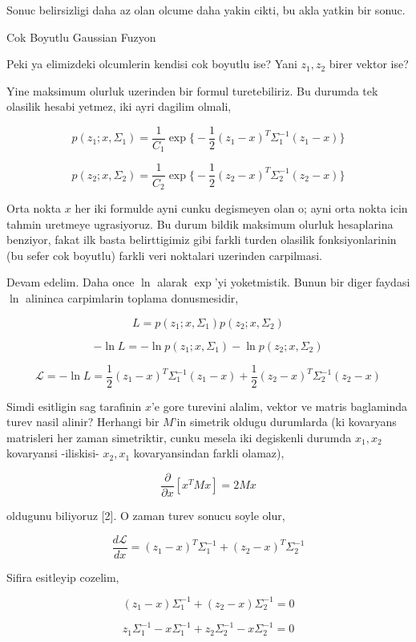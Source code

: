 \documentclass[12pt,fleqn]{article}\usepackage{../common}
\begin{document}
Sonuc belirsizligi daha az olan olcume daha yakin cikti, bu akla yatkin
bir sonuc.

Cok Boyutlu Gaussian Fuzyon

Peki ya elimizdeki olcumlerin kendisi cok boyutlu ise? Yani $z_1,z_2$ birer
vektor ise?

Yine maksimum olurluk uzerinden bir formul turetebiliriz. Bu durumda tek
olasilik hesabi yetmez, iki ayri dagilim olmali,

$$ p(z_1;x,\Sigma_1) =  \frac{ 1}{C_1} \exp 
\bigg\{ 
-\frac{ 1}{2}(z_1-x)^T\Sigma_1^{-1}(z_1-x)
\bigg\} $$

$$ p(z_2;x,\Sigma_2) =  \frac{ 1}{C_2} \exp 
\bigg\{ 
-\frac{ 1}{2}(z_2-x)^T\Sigma_2^{-1}(z_2-x)
\bigg\} $$

Orta nokta $x$ her iki formulde ayni cunku degismeyen olan o; ayni orta
nokta icin tahmin uretmeye ugrasiyoruz. Bu durum bildik maksimum olurluk
hesaplarina benziyor, fakat ilk basta belirttigimiz gibi farkli turden
olasilik fonksiyonlarinin (bu sefer cok boyutlu) farkli veri noktalari
uzerinden carpilmasi.

Devam edelim. Daha once $\ln$ alarak $\exp$'yi yoketmistik. Bunun bir diger
faydasi $\ln$ alininca carpimlarin toplama donusmesidir, 

$$ L = p(z_1;x,\Sigma_1) p(z_2;x,\Sigma_2) 
$$

$$ -\ln L = -\ln p(z_1;x,\Sigma_1) -\ln p(z_2;x,\Sigma_2) 
$$

$$ 
\mathcal{L} = 
-\ln L = 
\frac{ 1}{2}(z_1-x)^T\Sigma_1^{-1}(z_1-x) + 
\frac{ 1}{2}(z_2-x)^T\Sigma_2^{-1}(z_2-x)
$$

Simdi esitligin sag tarafinin $x$'e gore turevini alalim, vektor ve matris
baglaminda turev nasil alinir? Herhangi bir $M$'in simetrik oldugu
durumlarda (ki kovaryans matrisleri her zaman simetriktir, cunku mesela iki
degiskenli durumda $x_1,x_2$ kovaryansi -iliskisi- $x_2,x_1$ kovaryansindan
farkli olamaz),

$$ \frac{\partial}{\partial x}[x^TMx] = 2Mx $$

oldugunu biliyoruz [2]. O zaman turev sonucu soyle olur, 

$$ 
\frac{d\mathcal{L}}{dx} = 
(z_1-x)^T\Sigma_1^{-1} +  (z_2-x)^T\Sigma_2^{-1}
$$

Sifira esitleyip cozelim, 

$$ 
(z_1-x)\Sigma_1^{-1} +  (z_2-x)\Sigma_2^{-1} = 0
$$

$$ 
z_1\Sigma_1^{-1} - x\Sigma_1^{-1} + z_2\Sigma_2^{-1} - x\Sigma_2^{-1} = 0
$$
\end{document}
